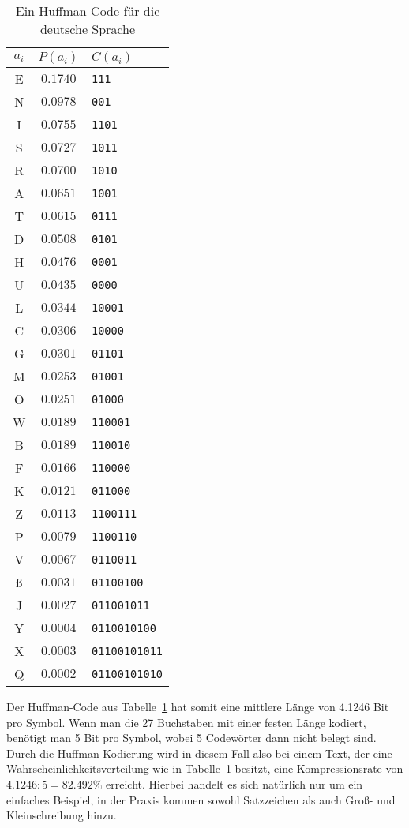 \documentclass[twoside,11pt,a4paper]{article}
\theoremstyle{break}
\begin{document}
\begin{table}[h]
\centering
\caption{Ein Huffman-Code für die deutsche Sprache}
\begin{tabular}{c|c|l}
$a_i$ & $P(a_i)$ & $C(a_i)$ \\ \hline
E & $0.1740$ & {\tt111} \\
N & $0.0978$ & {\tt001} \\
I & $0.0755$ & {\tt1101} \\
S & $0.0727$ & {\tt1011} \\
R & $0.0700$ & {\tt1010} \\
A & $0.0651$ & {\tt1001} \\
T & $0.0615$ & {\tt0111} \\
D & $0.0508$ & {\tt0101} \\
H & $0.0476$ & {\tt0001} \\
U & $0.0435$ & {\tt0000} \\
L & $0.0344$ & {\tt10001} \\
C & $0.0306$ & {\tt10000} \\
G & $0.0301$ & {\tt01101} \\
M & $0.0253$ & {\tt01001} \\
O & $0.0251$ & {\tt01000} \\
W & $0.0189$ & {\tt110001} \\
B & $0.0189$ & {\tt110010} \\
F & $0.0166$ & {\tt110000} \\
K & $0.0121$ & {\tt011000} \\
Z & $0.0113$ & {\tt1100111} \\
P & $0.0079$ & {\tt1100110} \\
V & $0.0067$ & {\tt0110011} \\
ß & $0.0031$ & {\tt01100100} \\
J & $0.0027$ & {\tt011001011} \\
Y & $0.0004$ & {\tt0110010100} \\
X & $0.0003$ & {\tt01100101011} \\
Q & $0.0002$ & {\tt01100101010}
\end{tabular}
\label{tab:HGER}
\end{table}

Der Huffman-Code aus Tabelle~\ref{tab:HGER} hat somit eine mittlere
Länge von 4.1246 Bit pro Symbol. Wenn man die 27 Buchstaben mit einer
festen Länge kodiert, benötigt man 5 Bit pro Symbol, wobei 5
Codewörter dann nicht belegt sind. Durch die Huffman-Kodierung wird in
diesem Fall also bei einem Text, der eine
Wahrscheinlichkeitsverteilung wie in Tabelle~\ref{tab:HGER} besitzt,
eine Kompressionsrate von $4.1246 : 5 = 82.492 \%$ erreicht. Hierbei
handelt es sich natürlich nur um ein einfaches Beispiel, in der Praxis
kommen sowohl Satzzeichen als auch Groß- und Kleinschreibung hinzu.
\end{document}
